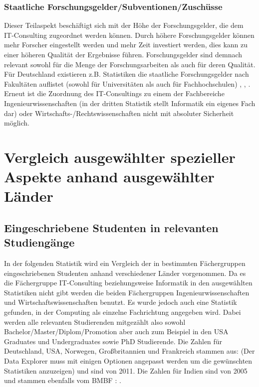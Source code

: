 \subsubsection*{Staatliche Forschungsgelder/Subventionen/Zuschüsse}
Dieser Teilaspekt beschäftigt sich mit der Höhe der Forschungsgelder, die dem IT-Consulting zugeordnet werden können. Durch höhere Forschungsgelder können mehr Forscher eingestellt werden und mehr Zeit investiert werden, dies kann zu einer höheren Qualität der Ergebnisse führen. Forschungsgelder sind demnach relevant sowohl für die Menge der Forschungsarbeiten als auch für deren Qualität.
Für Deutschland existieren z.B. Statistiken die staatliche Forschungsgelder nach Fakultäten auflistet (sowohl für Universitäten als auch für Fachhochschulen) \cite {ausgabenfakuni}, \cite {ausgabenfakfach}, \cite {ausgabenbmbf}. Erneut ist die Zuordnung des IT-Consultings zu einem der Fachbereiche Ingenieurwissenschaften (in der dritten Statistik stellt Informatik ein eigenes Fach dar) oder Wirtschafts-/Rechtswissenschaften nicht mit absoluter Sicherheit möglich.

\section{Vergleich ausgewählter spezieller Aspekte anhand ausgewählter Länder}

\subsection*{Eingeschriebene Studenten in relevanten Studiengänge}
In der folgenden Statistik wird ein Vergleich der in bestimmten Fächergruppen eingeschriebenen Studenten anhand verschiedener Länder vorgenommen. Da es die Fächergruppe IT-Consulting beziehungsweise Informatik in den ausgewählten Statistiken nicht gibt werden die beiden Fächergruppen Ingenieurwissenschaften und Wirtschaftswissenschaften benutzt. Es wurde jedoch auch eine Statistik gefunden, in der Computing als einzelne Fachrichtung angegeben wird. Dabei werden alle relevanten Studierenden mitgezählt also sowohl Bachelor/Master/Diplom/Promotion aber auch zum Beispiel in den USA Graduates und Undergraduates sowie PhD Studierende.
Die Zahlen für Deutschland, USA, Norwegen, Großbritannien und Frankreich stammen aus: \cite{studierende} (Der Data Explorer muss mit einigen Optionen angepasst werden um die gewünschten Statistiken anzuzeigen) und sind von 2011. Die Zahlen für Indien sind von 2005 und stammen ebenfalls vom BMBF : \cite{indienstudierende} .


